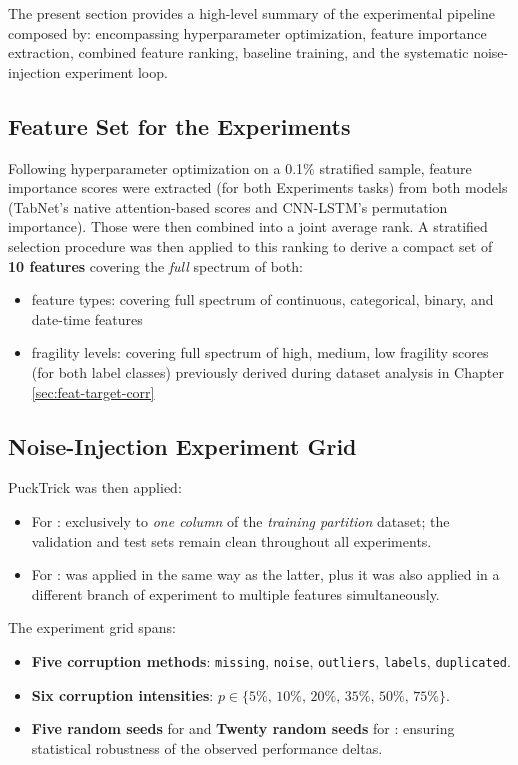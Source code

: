 \documentclass[../main.tex]{subfiles}
\begin{document}
The present section provides a high-level summary of the experimental pipeline composed by: encompassing hyperparameter optimization, feature importance extraction, combined feature ranking, baseline training, and the systematic noise-injection experiment loop. 

\subsection{Feature Set for the Experiments}
\label{sec:feature-set-summary}

Following hyperparameter optimization on a 0.1\% stratified sample, feature importance scores were extracted (for both Experiments tasks) from both models (TabNet's native attention-based scores and CNN-LSTM's permutation importance). Those were then combined into a joint average rank.  A stratified selection procedure was then applied to this ranking to derive a compact set of \textbf{10 features} covering the \emph{full} spectrum of both:
\begin{itemize}
    \item feature types: covering full spectrum of continuous, categorical, binary, and date-time features
    \item fragility levels: covering full spectrum of high, medium, low fragility scores (for both label classes) previously derived during dataset analysis in Chapter \ref{sec:feat-target-corr}
\end{itemize}   

\subsection{Noise-Injection Experiment Grid}
\label{sec:exp-grid-summary}

PuckTrick was then applied:
\begin{itemize}
    \item For : exclusively to \emph{one column} of the \emph{training partition} dataset; the validation and test sets remain clean throughout all experiments.  
    \item For : was applied in the same way as the latter, plus it was also applied in a different branch of experiment to multiple features simultaneously. 
\end{itemize}

The experiment grid spans:
\begin{itemize}
    \item \textbf{Five corruption methods}: \texttt{missing}, \texttt{noise}, \texttt{outliers}, \texttt{labels}, \texttt{duplicated}.
    \item \textbf{Six corruption intensities}: $p \in \{5\%,\,10\%,\,20\%,\,35\%,\,50\%,\,75\%\}$.
    \item \textbf{Five random seeds} for  and \textbf{Twenty random seeds} for : ensuring statistical robustness of the observed performance deltas.
\end{itemize}
\end{document}
